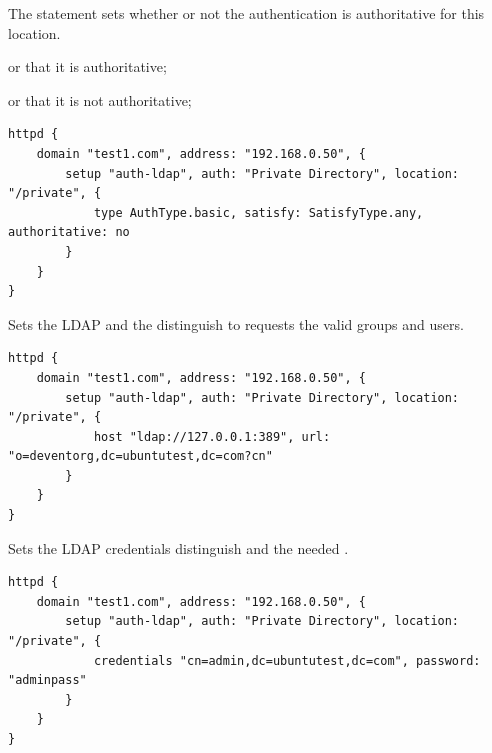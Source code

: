 The  statement sets whether or not the authentication
is authoritative for this location.
\begin{asparaitem}
\item {} or  that it is authoritative;
\item {} or  that it is not authoritative;
\end{asparaitem}

\begin{lstlisting}[style=Java]
httpd {
    domain "test1.com", address: "192.168.0.50", {
        setup "auth-ldap", auth: "Private Directory", location: "/private", {
            type AuthType.basic, satisfy: SatisfyType.any, authoritative: no
        }
    }
}
\end{lstlisting}


Sets the LDAP  and the distinguish  to requests the
valid groups and users.

\begin{lstlisting}[style=Java]
httpd {
    domain "test1.com", address: "192.168.0.50", {
        setup "auth-ldap", auth: "Private Directory", location: "/private", {
            host "ldap://127.0.0.1:389", url: "o=deventorg,dc=ubuntutest,dc=com?cn"
        }
    }
}
\end{lstlisting}


Sets the LDAP credentials distinguish  and the needed .

\begin{lstlisting}[style=Java]
httpd {
    domain "test1.com", address: "192.168.0.50", {
        setup "auth-ldap", auth: "Private Directory", location: "/private", {
            credentials "cn=admin,dc=ubuntutest,dc=com", password: "adminpass"
        }
    }
}
\end{lstlisting}


